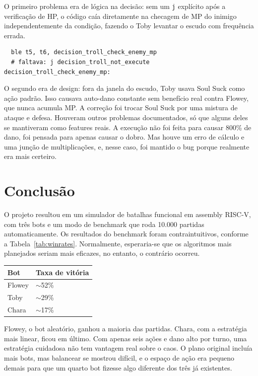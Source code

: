 \documentclass[AMA,twocolumn]{USG}
\begin{document}
O primeiro problema era de lógica na decisão: sem um \texttt{j} explícito após a verificação de HP, o código caía diretamente na checagem de MP do inimigo independentemente da condição, fazendo o Toby levantar o escudo com frequência errada.

\begin{verbatim}
  ble t5, t6, decision_troll_check_enemy_mp
  # faltava: j decision_troll_not_execute
decision_troll_check_enemy_mp:
\end{verbatim}

O segundo era de design: fora da janela do escudo, Toby usava Soul Suck como ação padrão. Isso causava auto-dano constante sem benefício real contra Flowey, que nunca acumula MP. A correção foi trocar Soul Suck por uma mistura de ataque e defesa.
Houveram outros problemas documentados, só que alguns deles se mantiveram como features reais. A execução
não foi feita para causar 800\% de dano, foi pensada para apenas causar o dobro. Mas houve um erro de cálculo e 
uma junção de multiplicações, e, nesse caso, foi mantido o bug porque realmente era mais certeiro.
\section{Conclusão}

O projeto resultou em um simulador de batalhas funcional em assembly RISC-V, com três bots e um modo de benchmark que roda 10.000 partidas automaticamente.
Os resultados do benchmark foram contraintuitivos, conforme a Tabela~\ref{tab:winrates}. Normalmente, esperaria-se que os algoritmos mais 
planejados seriam mais eficazes, no entanto, o contrário ocorreu.

\vspace{4pt}\noindent
{\renewcommand{\arraystretch}{1.5}
\begin{tabular}{ll}
\hline
\textbf{Bot} & \textbf{Taxa de vitória} \\
\hline
Flowey & $\sim$52\% \\
Toby   & $\sim$29\% \\
Chara  & $\sim$17\% \\
\hline
\end{tabular}}\label{tab:winrates}
\vspace{4pt}

Flowey, o bot aleatório, ganhou a maioria das partidas. Chara, com a estratégia mais linear, ficou em último. Com apenas seis ações e dano alto por turno, uma estratégia cuidadosa não tem vantagem real sobre o caos. O plano original incluía mais bots, mas balancear se mostrou difícil, e o espaço de ação era pequeno demais para que um quarto bot fizesse algo diferente dos três já existentes.
\end{document}
